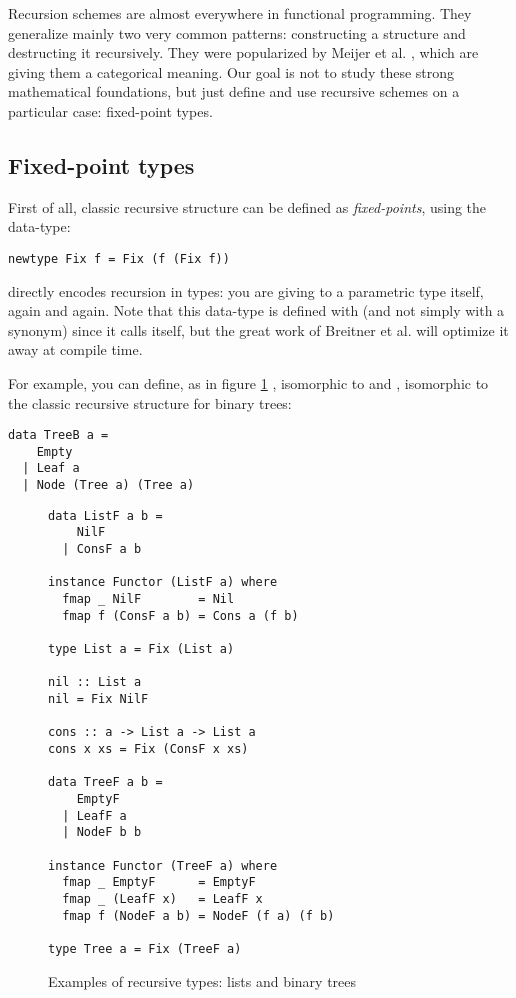 
Recursion schemes are almost everywhere in functional programming. They generalize mainly two very common patterns: constructing a structure and destructing it recursively. They were popularized by Meijer et al. \cite{4cec4a43c86444479dc0003182424795}, which are giving them a categorical meaning. Our goal is not to study these strong mathematical foundations, but just define and use recursive schemes on a particular case: fixed-point types.

\subsection{Fixed-point types}
\label{subsec:defi}
First of all, classic recursive structure can be defined as \emph{fixed-points}, using the  data-type:
\begin{verbatim}
newtype Fix f = Fix (f (Fix f))
\end{verbatim}
 directly encodes recursion in types: you are giving to a parametric type itself, again and again. Note that this data-type is defined with  (and not simply with a  synonym) since it calls itself, but the great work of Breitner et al. \cite{Breitner:2014:SZC:2692915.2628141} will optimize it away at compile time.

For example, you can define, as in figure \ref{fig:listtree}
, isomorphic to \minline{[a]} and , isomorphic to the classic recursive structure for binary trees:
\begin{verbatim}
data TreeB a =
    Empty
  | Leaf a
  | Node (Tree a) (Tree a)
\end{verbatim}

\begin{figure}
\begin{verbatim}
data ListF a b =
    NilF
  | ConsF a b

instance Functor (ListF a) where
  fmap _ NilF        = Nil
  fmap f (ConsF a b) = Cons a (f b)

type List a = Fix (List a)

nil :: List a
nil = Fix NilF

cons :: a -> List a -> List a
cons x xs = Fix (ConsF x xs)

data TreeF a b =
    EmptyF
  | LeafF a
  | NodeF b b

instance Functor (TreeF a) where
  fmap _ EmptyF      = EmptyF
  fmap _ (LeafF x)   = LeafF x
  fmap f (NodeF a b) = NodeF (f a) (f b)

type Tree a = Fix (TreeF a)
\end{verbatim}
\caption{Examples of recursive types: lists and binary trees}
\label{fig:listtree}
\end{figure}


